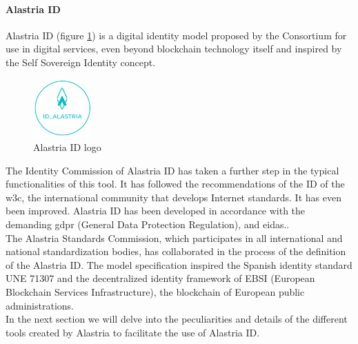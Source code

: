 \documentclass[a4paper, 12pt]{article} %
\begin{document}
                \paragraph{Alastria ID}
                    Alastria ID (figure \ref{fig:alastria_id_logo}) is a digital identity model proposed by the Consortium for use in digital services, even beyond blockchain technology itself and inspired by the Self Sovereign Identity concept.\\
                    \begin{figure}[h]
                        \centering
                        \includegraphics[width=0.2\textwidth]{alastria-id-logo.png}
                        \caption{Alastria ID logo}
                        \label{fig:alastria_id_logo}
                    \end{figure}
                
                    The Identity Commission of Alastria ID\cite{alastria-context} has taken a further step in the typical functionalities of this tool. It has followed the recommendations of the ID of the \acrfull{w3c}\cite{w3c}, the international community that develops Internet standards. It has even been improved. Alastria ID has been developed in accordance with the demanding \acrfull{gdpr}\cite{gdpr} (General Data Protection Regulation), and \acrfull{eidas}\cite{eidas}..\\

                    The Alastria Standards Commission, which participates in all international and national standardization bodies, has collaborated in the process of the definition of the Alastria ID. The model specification inspired the Spanish identity standard UNE 71307\cite{une-71307} and the decentralized identity framework of EBSI\cite{ebsi} (European Blockchain Services Infrastructure), the blockchain of European public administrations.\\
                    
                    In the next section we will delve into the peculiarities and details of the different tools created by Alastria to facilitate the use of Alastria ID.
\end{document}
